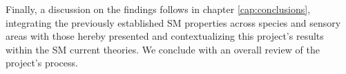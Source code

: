 Finally, a discussion on the findings follows in chapter \ref{cap:conclusions}, integrating the previously established SM properties across species and sensory areas with those hereby presented and contextualizing this project's results within the SM current theories. We conclude with an overall review of the project's process.





